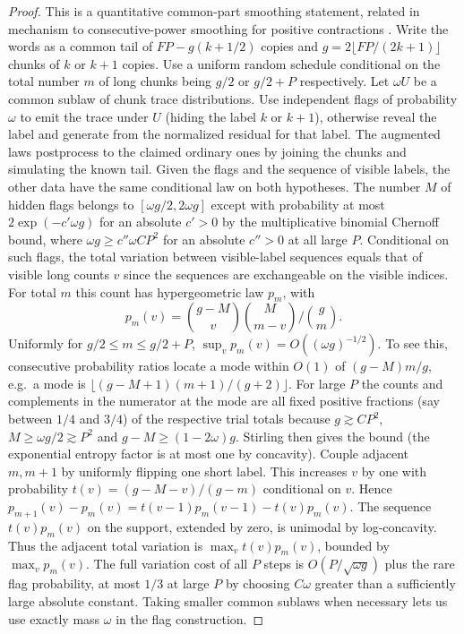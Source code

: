 \begin{proof}
This is a quantitative common-part smoothing statement, related in mechanism to consecutive-power smoothing for positive contractions \citep[Propositions 2.2--2.3]{Zaharopol1989}.  Write the words as a common tail of $FP-g(k+1/2)$ copies
and $g=2\lfloor FP/(2k+1)\rfloor$ chunks of $k$ or $k+1$ copies.
Use a uniform random schedule conditional on the total number
$m$ of long chunks being $g/2$ or $g/2+P$ respectively.
Let $\omega U$ be a common sublaw of chunk trace distributions. Use
independent flags of probability $\omega$ to emit the trace under $U$
(hiding the label $k$ or $k+1$), otherwise reveal the label and
generate from the normalized residual for that label. The augmented
laws postprocess to the claimed ordinary ones by joining the chunks
and simulating the known tail. Given the flags and the sequence of
visible labels, the other data have the same conditional law on both
hypotheses. The number $M$ of hidden flags belongs to
$[\omega g/2,2\omega g]$ except with probability at most
$2\exp(-c'\omega g)$ for an absolute $c'>0$ by the multiplicative
binomial Chernoff bound, where
$\omega g\ge c'' \omega C P^2$ for an absolute $c''>0$ at all large $P$.
Conditional on such flags, the total variation between visible-label
sequences equals that of visible long counts $v$ since the sequences
are exchangeable on the visible indices. For total $m$ this count
has hypergeometric law $p_m$, with
\[
 p_m(v)={\binom{g-M}{v}\binom{M}{m-v}}/{\binom{g}{m}}.
\]
Uniformly for $g/2\le m\le g/2+P$,
$\sup_v p_m(v)=O((\omega g)^{-1/2})$. To see this, consecutive
probability ratios locate a mode within $O(1)$ of $(g-M)m/g$,
e.g.\ a mode is $\lfloor(g-M+1)(m+1)/(g+2)\rfloor$. For large $P$
the counts and complements in the numerator at the mode are all
fixed positive fractions (say between $1/4$ and $3/4$)
of the respective trial totals because $g\gtrsim C P^2$,
$M\ge\omega g/2\gtrsim P^2$ and $g-M\ge (1-2\omega)g$.
Stirling then gives the bound (the exponential
entropy factor is at most one by concavity). Couple adjacent $m,m+1$
by uniformly flipping one short label. This increases $v$ by one
with probability $t(v)=(g-M-v)/(g-m)$ conditional on $v$.
Hence $p_{m+1}(v)-p_m(v)=t(v-1)p_m(v-1)-t(v)p_m(v)$. The sequence
$t(v)p_m(v)$ on the support, extended by zero, is unimodal by
log-concavity. Thus the adjacent total variation is $\max_v t(v)p_m(v)$,
bounded by $\max_v p_m(v)$. The full variation cost of all $P$ steps
is $O(P/\sqrt{\omega g})$ plus the rare flag probability, at most
$1/3$ at large $P$ by choosing $C\omega$ greater than a sufficiently
large absolute constant. Taking smaller common sublaws when necessary lets
us use exactly mass $\omega$ in the flag construction.
\end{proof}


